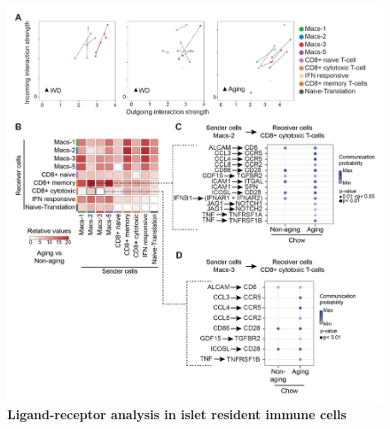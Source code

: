 
\begin{figure}[!t]
    \centering
    \includegraphics[width=\linewidth]{Appendix2/Fig/F2-A1-01.png}
    \caption[suppl-fig:cell-cell1]{\textbf{Ligand-receptor analysis in islet resident immune cells }\\
}
\end{figure}
